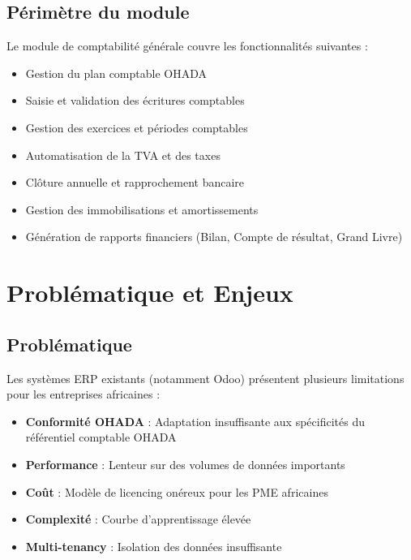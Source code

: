 \documentclass[12pt]{report}
\begin{document}
\section{Périmètre du module}
Le module de comptabilité générale couvre les fonctionnalités suivantes :
\begin{itemize}
    \item Gestion du plan comptable OHADA
    \item Saisie et validation des écritures comptables
    \item Gestion des exercices et périodes comptables
    \item Automatisation de la TVA et des taxes
    \item Clôture annuelle et rapprochement bancaire
    \item Gestion des immobilisations et amortissements
    \item Génération de rapports financiers (Bilan, Compte de résultat, Grand Livre)
\end{itemize}

\chapter{Problématique et Enjeux}

\section{Problématique}
Les systèmes ERP existants (notamment Odoo) présentent plusieurs limitations pour les entreprises africaines :

\begin{tcolorbox}[colframe=orange, colback=orange!10, boxrule=2pt, arc=6pt, title={Limitations identifiées}, coltitle=black]
\begin{itemize}
    \item \textbf{Conformité OHADA} : Adaptation insuffisante aux spécificités du référentiel comptable OHADA
    \item \textbf{Performance} : Lenteur sur des volumes de données importants
    \item \textbf{Coût} : Modèle de licencing onéreux pour les PME africaines
    \item \textbf{Complexité} : Courbe d'apprentissage élevée
    \item \textbf{Multi-tenancy} : Isolation des données insuffisante
\end{itemize}
\end{tcolorbox}
\end{document}
